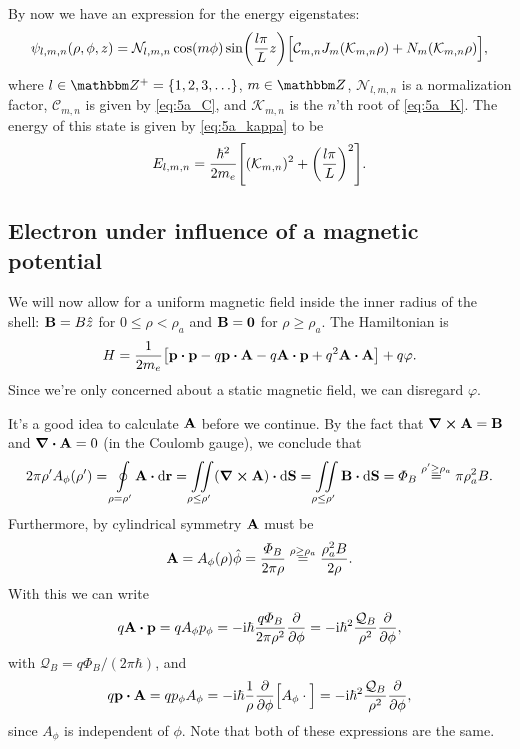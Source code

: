 \documentclass[11pt,letter, swedish, english
]{article}
\begin{document}
By now we have an expression for the energy eigenstates:
\begin{equation}
\psi_{l,m,n}(\rho, \phi, z)=
\mathcal{N}_{l,m,n}\cos(m\phi)\sin(\frac{l\pi}{L}z)
\Big[\mathcal{C}_{m,n}J_m\qty(\mathcal{K}_{m,n}\rho)+
N_m\qty(\mathcal{K}_{m,n}\rho) \Big],
\end{equation}
where $l\in\Z^+=\{1, 2, 3,\ldots\}$, $m\in\Z$, $\mathcal{N}_{l,m,n}$
is a normalization factor,  $\mathcal{C}_{m,n}$ is given by
\eqref{eq:5a_C}, and $\mathcal{K}_{m,n}$ is the $n$'th root of
\eqref{eq:5a_K}. The energy of this state is given by
\eqref{eq:5a_kappa} to be
\begin{equation}
E_{l,m,n}=\frac{\hbar^2}{2m_e}\qty[(\mathcal{K}_{m,n})^2 + \qty(\frac{l\pi}{L})^2].
\end{equation}




\subsection{Electron under influence of a magnetic potential}
\newcommand{\q}{\ensuremath{\mathcal{Q}_B}}
We will now allow for a uniform magnetic field inside the inner radius of
the shell: $\vb{B}=B\hat{z}$ for $0\le\rho<\rho_a$ and $\vb{B}=\vb{0}$
for $\rho\ge\rho_a$. The Hamiltonian is 
\begin{equation}
H=\frac{1}{2m_e}\qty[\vb{p}\vdot\vb{p}
-q\vb{p}\vdot\vb{A}-q\vb{A}\vdot\vb{p}+q^2\vb{A}\vdot\vb{A}] 
+ q\varphi.
\end{equation}
Since we're only concerned about a static magnetic field, we can
disregard $\varphi$.

It's a good idea to calculate $\vb{A}$ before we continue. By the
fact that $\curl{\vb{A}}=\vb{B}$ and
$\div\vb{A}=0$ (in the Coulomb gauge), we conclude that
\begin{equation}\label{eq:5b_Aphi}
2\pi\rho' A_\phi(\rho')=\oint\limits_{\rho=\rho'}\!\vb{A}\vdot\rd{\vb{r}}
=\iint\limits_{\rho\le\rho'}(\curl\vb{A})\vdot\rd\vb{S}
=\iint\limits_{\rho\le\rho'}\vb{B}\vdot\rd\vb{S}
=\varPhi_B\stackrel{\rho'\ge\rho_a}{=}\pi\rho_a^2B.
\end{equation}
Furthermore, by cylindrical symmetry $\vb{A}$ must be
\begin{equation}
\vb{A}=A_\phi(\rho)\hat\phi=\frac{\varPhi_B}{2\pi\rho}
\stackrel{\rho\ge\rho_a}{=}\frac{\rho_a^2B}{2\rho}.
\end{equation}
With this we can write
\begin{equation}
q\vb{A}\vdot\vb{p}= qA_\phi p_\phi
=-\ii\hbar\frac{q\varPhi_B}{2\pi\rho^2}\pdv{\phi}
=-\ii\hbar^2\frac{\q}{\rho^2}\pdv{\phi},
\end{equation}
with $\q=q\varPhi_B/(2\pi\hbar)$, and
\begin{equation}
q\vb{p}\vdot\vb{A}=qp_\phi A_\phi 
= -\ii\hbar\frac{1}{\rho}\pdv{\phi}\Big[A_\phi\cdot\Big]
=-\ii\hbar^2\frac{\q}{\rho^2}\pdv{\phi},
\end{equation}
since $A_\phi$ is independent of $\phi$.
Note that both of these expressions are the same.
\end{document}

